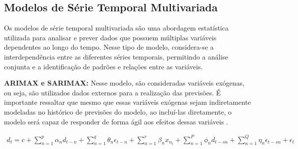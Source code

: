 \subsection{Modelos de S\'erie Temporal Multivariada}\label{subsec:mult}

Os modelos de série temporal multivariada são uma abordagem estatística utilizada para analisar e prever dados que possuem múltiplas variáveis dependentes ao longo do tempo. Nesse tipo de modelo, considera-se a interdependência entre as diferentes séries temporais, permitindo a análise conjunta e a identificação de padrões e relações entre as variáveis. 

\textbf{ARIMAX e SARIMAX:}
Nesse modelo, são consideradas variáveis exógenas, ou seja, são utilizados dados externos para a realização das previsões. É importante ressaltar que mesmo que essas variáveis exógenas sejam indiretamente modeladas no histórico de previsões do modelo, ao incluí-las diretamente, o modelo será capaz de responder de forma ágil aos efeitos dessas variáveis  \cite{sarima}.

\begin{eqnarray}
	d_t=c+\sum_{n=1}^p \alpha_n d_{t-n}+\sum_{n=1}^q \theta_n \epsilon_{t-n}+\sum_{n=1}^r \beta_n x_{n_t}+\sum_{n=1}^P \phi_n d_{t-s n}+\sum_{n=1}^Q \eta_n \epsilon_{t-s n}+\epsilon_t \label{eq:sarmax}
\end{eqnarray}



